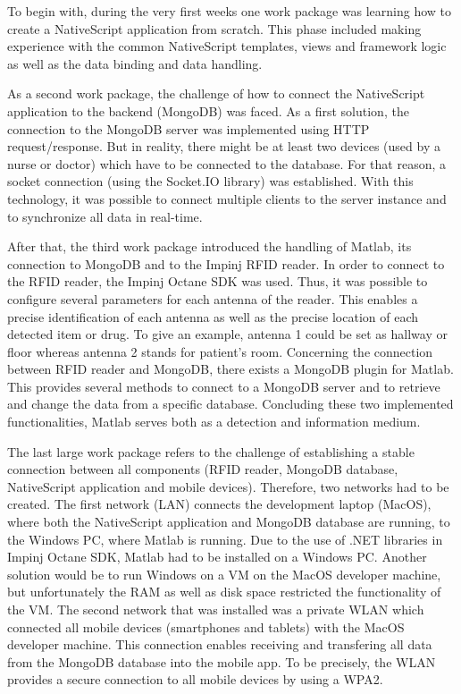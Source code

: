 To begin with, during the very first weeks one work package was learning how to create a NativeScript application from scratch. This phase included making experience with the common NativeScript templates, views and framework logic as well as the data binding and data handling.

As a second work package, the challenge of how to connect the NativeScript application to the backend (MongoDB) was faced. As a first solution, the connection to the MongoDB server was implemented using HTTP request/response. But in reality, there might be at least two devices (used by a nurse or doctor) which have to be connected to the database. For that reason, a socket connection (using the Socket.IO library) was established. With this technology, it was possible to connect multiple clients to the server instance and to synchronize all data in real-time.

After that, the third work package introduced the handling of Matlab, its connection to MongoDB and to the Impinj RFID reader. In order to connect to the RFID reader, the Impinj Octane SDK was used. Thus, it was possible to configure several parameters for each antenna of the reader. This enables a precise identification of each antenna as well as the precise location of each detected item or drug. To give an example, antenna 1 could be set as hallway or floor whereas antenna 2 stands for patient's room. 
Concerning the connection between RFID reader and MongoDB, there exists a MongoDB plugin for Matlab. This provides several methods to connect to a MongoDB server and to retrieve and change the data from a specific database. Concluding these two implemented functionalities, Matlab serves both as a detection and information medium.

The last large work package refers to the challenge of establishing a stable connection between all components (RFID reader, MongoDB database, NativeScript application and mobile devices). Therefore, two networks had to be created. The first network (LAN) connects the development laptop (MacOS), where both the NativeScript application and MongoDB database are running, to the Windows PC, where Matlab is running. Due to the use of .NET libraries in Impinj Octane SDK, Matlab had to be installed on a Windows PC. Another solution would be to run Windows on a VM on the MacOS developer machine, but unfortunately the RAM as well as disk space restricted the functionality of the VM. The second network that was installed was a private WLAN which connected all mobile devices (smartphones and tablets) with the MacOS developer machine. This connection enables receiving and transfering all data from the MongoDB database into the mobile app. To be precisely, the WLAN provides a secure connection to all mobile devices by using a \ac{WPA2}.

